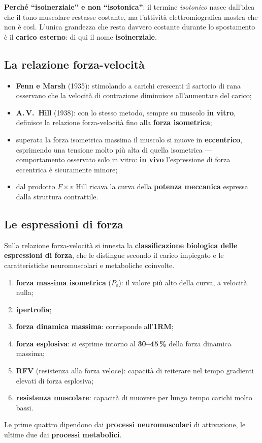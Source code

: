 \textbf{Perché ``isoinerziale'' e non ``isotonica''}: il termine \textit{isotonico} nasce dall'idea
che il tono muscolare restasse costante, ma l'attività elettromiografica mostra che non è così.
L'unica grandezza che resta davvero costante durante lo spostamento è il \textbf{carico esterno}:
di qui il nome \textbf{isoinerziale}.

\subsection{La relazione forza-velocità}

\begin{itemize}
  \item \textbf{Fenn e Marsh} (1935): stimolando a carichi crescenti il sartorio di rana osservano
    che la velocità di contrazione diminuisce all'aumentare del carico;
  \item \textbf{A.\,V.\ Hill} (1938): con lo stesso metodo, sempre su muscolo \textbf{in vitro},
    definisce la relazione forza-velocità fino alla \textbf{forza isometrica};
  \item superata la forza isometrica massima il muscolo si muove in \textbf{eccentrico}, esprimendo
    una tensione molto più alta di quella isometrica --- comportamento osservato solo in vitro:
    \textbf{in vivo} l'espressione di forza eccentrica è sicuramente minore;
  \item dal prodotto $F \times v$ Hill ricava la curva della \textbf{potenza meccanica} espressa
    dalla struttura contrattile.
\end{itemize}

\subsection{Le espressioni di forza}

Sulla relazione forza-velocità si innesta la \textbf{classificazione biologica delle espressioni di
  forza}, che le distingue secondo il carico impiegato e le caratteristiche neuromuscolari e
  metaboliche coinvolte.

\begin{enumerate}
  \item \textbf{forza massima isometrica} ($P_o$): il valore più alto della curva, a velocità nulla;
  \item \textbf{ipertrofia};
  \item \textbf{forza dinamica massima}: corrisponde all'\textbf{1RM};
  \item \textbf{forza esplosiva}: si esprime intorno al \textbf{30--45\,\%} della forza dinamica
    massima;
  \item \textbf{RFV} (resistenza alla forza veloce): capacità di reiterare nel tempo gradienti
    elevati di forza esplosiva;
  \item \textbf{resistenza muscolare}: capacità di muovere per lungo tempo carichi molto bassi.
\end{enumerate}
Le prime quattro dipendono dai \textbf{processi neuromuscolari} di attivazione, le ultime due dai
\textbf{processi metabolici}.

